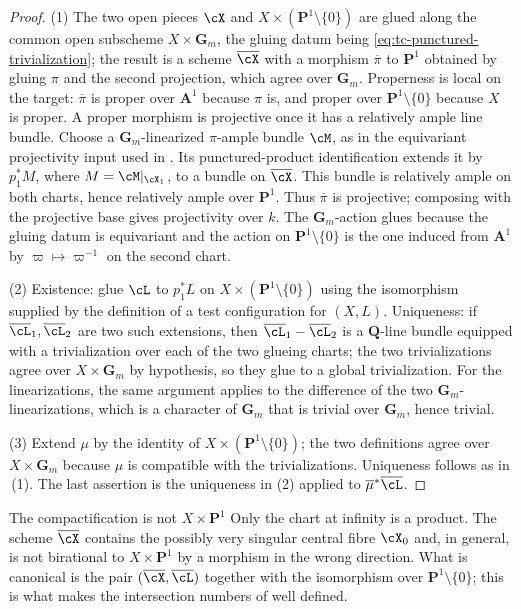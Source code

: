\begin{proof}
(1)  The two open pieces $\cX$ and $X\times(\mathbf P^1\setminus\{0\})$
are glued along the common open subscheme $X\times\mathbf G_m$, the
gluing datum being \eqref{eq:tc-punctured-trivialization}; the result is a
scheme $\overline\cX$ with a morphism $\overline\pi$ to
$\mathbf P^1$ obtained by gluing $\pi$ and the second projection, which
agree over $\mathbf G_m$.  Properness is local on the target:
$\overline\pi$ is proper over $\mathbf A^1$ because $\pi$ is, and
proper over $\mathbf P^1\setminus\{0\}$ because $X$ is proper.  A proper
morphism is projective once it has a relatively ample line bundle.
Choose a $\mathbf G_m$-linearized $\pi$-ample bundle $\cM$, as in the
equivariant projectivity input used in \cite[Lemma~1.8]{BJ22}.  Its
punctured-product identification extends it by $p_1^\ast M$, where
$M=\cM|_{\cX_1}$, to a bundle on $\overline\cX$.  This bundle is
relatively ample on both charts, hence relatively ample over
$\mathbf P^1$.  Thus $\overline\pi$ is projective; composing with the
projective base gives projectivity over $k$.
The $\mathbf G_m$-action glues because the gluing datum is equivariant
and the action on $\mathbf P^1\setminus\{0\}$ is the one induced from
$\mathbf A^1$ by $\varpi\mapsto\varpi^{-1}$ on the second chart.

(2)  Existence: glue $\cL$ to $p_1^\ast L$ on
$X\times(\mathbf P^1\setminus\{0\})$ using the isomorphism supplied by
the definition of a test configuration for $(X,L)$.  Uniqueness: if
$\overline\cL_1,\overline\cL_2$ are two such extensions, then
$\overline\cL_1-\overline\cL_2$ is a $\mathbf Q$-line bundle equipped
with a trivialization over each of the two glueing charts; the two
trivializations agree over $X\times\mathbf G_m$ by hypothesis, so they
glue to a global trivialization.  For the linearizations, the same argument
applies to the difference of the two $\mathbf G_m$-linearizations, which
is a character of $\mathbf G_m$ that is trivial over $\mathbf G_m$,
hence trivial.

(3)  Extend $\mu$ by the identity of
$X\times(\mathbf P^1\setminus\{0\})$; the two definitions agree over
$X\times\mathbf G_m$ because $\mu$ is compatible with the
trivializations.  Uniqueness follows as in
\,(1).  The last assertion is the
uniqueness in (2) applied to $\overline\mu^\ast\overline\cL$.
\end{proof}

\begin{warning}{The compactification is not $X\times\mathbf P^1$}
\label{warn:ch33-compactification-not-product}
Only the chart at infinity is a product.  The scheme $\overline\cX$
contains the possibly very singular central fibre $\cX_0$ and, in
general, is not birational to $X\times\mathbf P^1$ by a morphism in the
wrong direction.  What is canonical is the pair
$(\overline\cX,\overline\cL)$ together with the isomorphism over
$\mathbf P^1\setminus\{0\}$; this is what makes the intersection numbers
of  well defined.
\end{warning}

